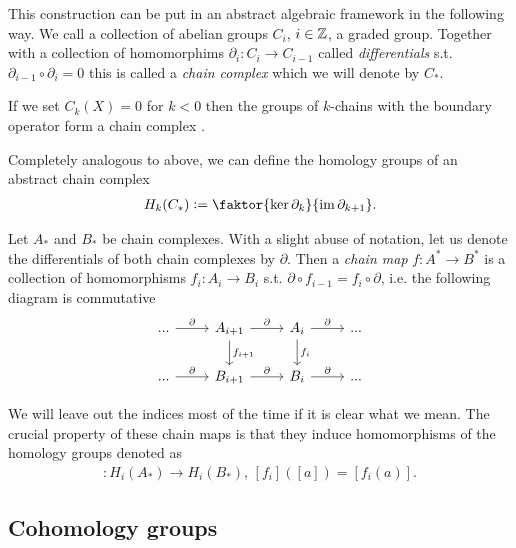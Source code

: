 \documentclass[../master_thesis.tex]{subfiles}
\begin{document}
This construction can be put in an abstract algebraic framework in the following 
way. We call a collection of abelian groups $C_i$, $i\in \mathbb{Z}$, a graded group.                                                   
Together with a collection of homomorphims $\partial_i: C_i \rightarrow C_{i-1}$ 
called \textit{differentials}
s.t. $\partial_{i-1} \circ \partial_i = 0$ this is called a \textit{chain complex} which 
we will denote by $C_*$. 

\begin{example}
    If we set $C_k(X) = {0}$ for $k < 0$ then the groups of $k$-chains with 
    the boundary operator form a chain complex . 
\end{example}

Completely analogous to above, we can define the homology groups 
of an abstract chain complex
\begin{align*}
    H_k(C_*) \vcentcolon= \faktor{\ker \partial_k}{\Ima \partial_{k+1}}.
\end{align*}

\begin{definition}
    Let $A_*$ and $B_*$ be chain complexes. With a slight abuse of notation,
    let us denote the differentials of 
    both chain complexes by $\partial$.
    Then a \textit{chain map} $f: A^* \rightarrow B^*$ is a collection 
    of homomorphisms $f_i: A_i \rightarrow B_i$ s.t. 
    $\partial \circ f_{i-1} = f_i \circ \partial$, i.e. the following diagram is commutative
    \begin{equation*}
        \begin{tikzcd}
            ... \arrow[r, "\partial"] 
                & A_{i+1} \arrow[r, "\partial"] \arrow[d, "f_{i+1}"] & A_i \arrow[r, "\partial"] \arrow[d, "f_i"] 
                & ...\\
            ... \arrow[r, "\partial"] 
                & B_{i+1} \arrow[r, "\partial"] & B_i \arrow[r, "\partial"] 
                & ...
        \end{tikzcd}
    \end{equation*}
\end{definition}
We will leave out the 
indices most of the time if it is clear what we mean.
The crucial property of these chain maps is that they induce homomorphisms of
the homology groups denoted as
\begin{align*}
    [f_i]: H_i(A_*) \rightarrow H_i(B_*), \, [f_i]([a]) = [f_i(a)].
\end{align*}

\subsection{Cohomology groups}\label{sec:cohomology_groups}
\end{document}
